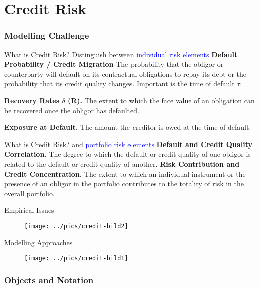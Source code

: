\part{Credit Risk}
\section{Modelling Challenge}

What is Credit Risk?
Distinguish between \textcolor{blue}{individual risk elements}
	{\bf Default Probability / Credit Migration} The probability that the obligor
	or counterparty will default on its contractual obligations to
	repay its debt or the probability that its credit quality changes. Important is the time of default $\tau$.
	
	{\bf Recovery Rates $\delta$ (R).} The extent to which the face value of
	an obligation can be recovered once the obligor has defaulted.
 
	{\bf Exposure at Default.} The amount the creditor is owed at the time of default.


What is Credit Risk?
and \textcolor{blue}{portfolio risk elements}
	{\bf Default and Credit Quality Correlation.} The degree to
	which the default or credit quality of one obligor is related to
	the default or credit quality of another.
	{\bf Risk Contribution and Credit Concentration.} The extent
	to which an individual instrument or the presence of an obligor in
	the portfolio contributes to the totality of risk in the overall
	portfolio.


Empirical Issues
\begin{figure}[htp]
\begin{center}
  \texttt{[image: ../pics/credit-bild2]}
\end{center}
\end{figure}


Modelling Approaches
\begin{figure}[htp]
\begin{center}
  \texttt{[image: ../pics/credit-bild1]}
\end{center}
\end{figure}



\section{Objects and Notation}

